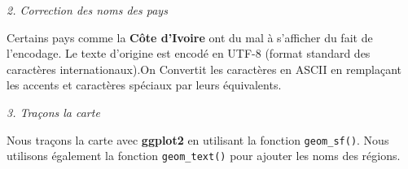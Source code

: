 \documentclass[
]{article}
\newenvironment{Shaded}{\begin{snugshade}}{\end{snugshade}}
\newcommand{\AttributeTok}[1]{\textcolor[rgb]{0.13,0.29,0.53}{#1}}
\newcommand{\CommentTok}[1]{\textcolor[rgb]{0.56,0.35,0.01}{\textit{#1}}}
\newcommand{\FunctionTok}[1]{\textcolor[rgb]{0.13,0.29,0.53}{\textbf{#1}}}
\newcommand{\NormalTok}[1]{#1}
\newcommand{\OtherTok}[1]{\textcolor[rgb]{0.56,0.35,0.01}{#1}}
\newcommand{\SpecialCharTok}[1]{\textcolor[rgb]{0.81,0.36,0.00}{\textbf{#1}}}
\newcommand{\StringTok}[1]{\textcolor[rgb]{0.31,0.60,0.02}{#1}}
\begin{document}
\emph{2. Correction des noms des pays}

Certains pays comme la \textbf{Côte d'Ivoire} ont du mal à s'afficher du
fait de l'encodage. Le texte d'origine est encodé en UTF-8 (format
standard des caractères internationaux).On Convertit les caractères en
ASCII en remplaçant les accents et caractères spéciaux par leurs
équivalents.

\begin{Shaded}
\end{Shaded}

\emph{3. Traçons la carte}

Nous traçons la carte avec \textbf{ggplot2} en utilisant la fonction
\texttt{geom\_sf()}. Nous utilisons également la fonction
\texttt{geom\_text()} pour ajouter les noms des régions.
\end{document}
